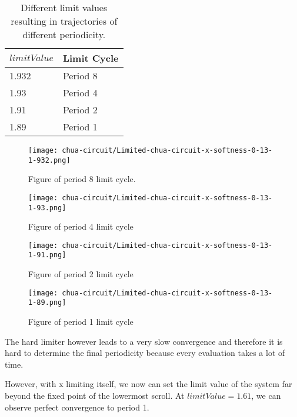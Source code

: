 \documentclass[main]{subfiles}
\begin{document}
\begin{table}[H]
\renewcommand{\arraystretch}{1.2}
\center
\begin{tabular}{@{}ll@{}}
	\toprule
   \(limitValue\) & Limit Cycle\\
   \midrule
   1.932 & Period 8 \\ 
   1.93 & Period 4 \\
   1.91  & Period 2 \\
   1.89 & Period 1 \\
   \bottomrule
\end{tabular}
\caption[Limiter values for periodic trajectories for for an x self-limiting limiter with softness 0.13]{Different limit values resulting in trajectories of different periodicity.}
\label{table:x-0.13-periodicities}
\end{table}

\begin{figure}[H]
\centering
\texttt{[image: chua-circuit/Limited-chua-circuit-x-softness-0-13-1-932.png]}
\caption[Figure of period 8 limit cycle]{Figure of period 8 limit cycle.}
\label{figure:chaotictrajectories}
\end{figure}

\begin{figure}[H]
\centering
\texttt{[image: chua-circuit/Limited-chua-circuit-x-softness-0-13-1-93.png]}
\caption[Figure of period 4 limit cycle]{Figure of period 4 limit cycle}
\label{figure:chaotictrajectories}
\end{figure}

\begin{figure}[H]
\centering
\texttt{[image: chua-circuit/Limited-chua-circuit-x-softness-0-13-1-91.png]}
\caption[Figure of period 3 limit cycle]{Figure of period 2 limit cycle}
\label{figure:chaotictrajectories}
\end{figure}

\begin{figure}[H]
\centering
\texttt{[image: chua-circuit/Limited-chua-circuit-x-softness-0-13-1-89.png]}
\caption[Figure of period 1 limit cycle]{Figure of period 1 limit cycle}
\label{figure:chaotictrajectories}
\end{figure}

The hard limiter however leads to a very slow convergence and therefore it is hard to determine the final periodicity because every evaluation takes a lot of time.

However, with x limiting itself, we now can set the limit value of the system far beyond the fixed point of the lowermost scroll. At \(limitValue=1.61\), we can observe perfect convergence to period 1.
\end{document}
